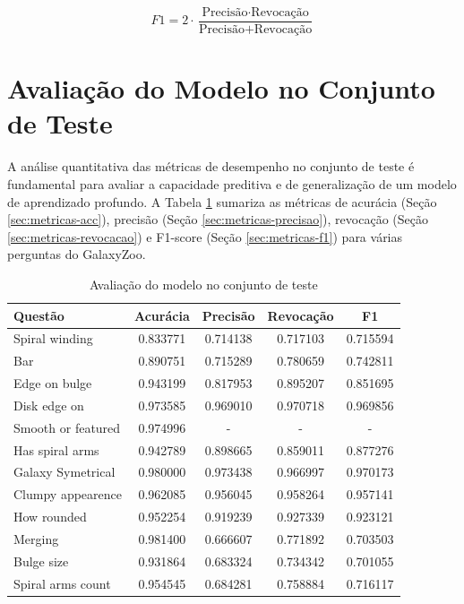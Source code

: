 \begin{equation}\label{eq:f1}
  F1 = 2 \cdot \frac{\text{Precisão} \cdot \text{Revocação}}{\text{Precisão} + \text{Revocação}}
\end{equation}









\section{Avaliação do Modelo no Conjunto de Teste}
\label{sec:res-teste}

A análise quantitativa das métricas de desempenho no conjunto de teste é fundamental para avaliar a capacidade preditiva e de generalização de um modelo de aprendizado profundo. A Tabela \ref{tab:test-metrics} sumariza as métricas de acurácia (Seção \ref{sec:metricas-acc}), precisão (Seção \ref{sec:metricas-precisao}), revocação (Seção \ref{sec:metricas-revocacao}) e F1-score (Seção \ref{sec:metricas-f1}) para várias perguntas do GalaxyZoo.

\begin{table}[!ht]
  \centering
  \caption{Avaliação do modelo no conjunto de teste}
  \label{tab:test-metrics}
  \begin{tabular}{lcccc}
    \toprule
    Questão            & Acurácia & Precisão & Revocação & F1       \\
    \midrule
    Spiral winding     & 0.833771 & 0.714138 & 0.717103  & 0.715594 \\
    Bar                & 0.890751 & 0.715289 & 0.780659  & 0.742811 \\
    Edge on bulge      & 0.943199 & 0.817953 & 0.895207  & 0.851695 \\
    Disk edge on       & 0.973585 & 0.969010 & 0.970718  & 0.969856 \\
    Smooth or featured & 0.974996 & -        & -         & -        \\
    Has spiral arms    & 0.942789 & 0.898665 & 0.859011  & 0.877276 \\
    Galaxy Symetrical  & 0.980000 & 0.973438 & 0.966997  & 0.970173 \\
    Clumpy appearence  & 0.962085 & 0.956045 & 0.958264  & 0.957141 \\
    How rounded        & 0.952254 & 0.919239 & 0.927339  & 0.923121 \\
    Merging            & 0.981400 & 0.666607 & 0.771892  & 0.703503 \\
    Bulge size         & 0.931864 & 0.683324 & 0.734342  & 0.701055 \\
    Spiral arms count  & 0.954545 & 0.684281 & 0.758884  & 0.716117 \\
    \bottomrule
  \end{tabular}
\end{table}

